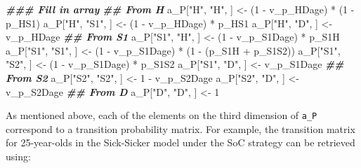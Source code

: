 \documentclass[
]{article}
\newenvironment{Shaded}{\begin{snugshade}}{\end{snugshade}}
\newcommand{\DecValTok}[1]{\textcolor[rgb]{0.00,0.00,0.81}{#1}}
\newcommand{\DocumentationTok}[1]{\textcolor[rgb]{0.56,0.35,0.01}{\textbf{\textit{#1}}}}
\newcommand{\NormalTok}[1]{#1}
\newcommand{\OtherTok}[1]{\textcolor[rgb]{0.56,0.35,0.01}{#1}}
\newcommand{\SpecialCharTok}[1]{\textcolor[rgb]{0.00,0.00,0.00}{#1}}
\newcommand{\StringTok}[1]{\textcolor[rgb]{0.31,0.60,0.02}{#1}}
\begin{document}
\begin{Shaded}
\begin{Highlighting}[]
\DocumentationTok{\#\#\# Fill in array}
\DocumentationTok{\#\# From H}
\NormalTok{a\_P[}\StringTok{"H"}\NormalTok{, }\StringTok{"H"}\NormalTok{, ]   }\OtherTok{\textless{}{-}}\NormalTok{ (}\DecValTok{1} \SpecialCharTok{{-}}\NormalTok{ v\_p\_HDage) }\SpecialCharTok{*}\NormalTok{ (}\DecValTok{1} \SpecialCharTok{{-}}\NormalTok{ p\_HS1)}
\NormalTok{a\_P[}\StringTok{"H"}\NormalTok{, }\StringTok{"S1"}\NormalTok{, ]  }\OtherTok{\textless{}{-}}\NormalTok{ (}\DecValTok{1} \SpecialCharTok{{-}}\NormalTok{ v\_p\_HDage) }\SpecialCharTok{*}\NormalTok{ p\_HS1}
\NormalTok{a\_P[}\StringTok{"H"}\NormalTok{, }\StringTok{"D"}\NormalTok{, ]   }\OtherTok{\textless{}{-}}\NormalTok{ v\_p\_HDage}
\DocumentationTok{\#\# From S1}
\NormalTok{a\_P[}\StringTok{"S1"}\NormalTok{, }\StringTok{"H"}\NormalTok{, ]  }\OtherTok{\textless{}{-}}\NormalTok{ (}\DecValTok{1} \SpecialCharTok{{-}}\NormalTok{ v\_p\_S1Dage) }\SpecialCharTok{*}\NormalTok{ p\_S1H}
\NormalTok{a\_P[}\StringTok{"S1"}\NormalTok{, }\StringTok{"S1"}\NormalTok{, ] }\OtherTok{\textless{}{-}}\NormalTok{ (}\DecValTok{1} \SpecialCharTok{{-}}\NormalTok{ v\_p\_S1Dage) }\SpecialCharTok{*}\NormalTok{ (}\DecValTok{1} \SpecialCharTok{{-}}\NormalTok{ (p\_S1H }\SpecialCharTok{+}\NormalTok{ p\_S1S2))}
\NormalTok{a\_P[}\StringTok{"S1"}\NormalTok{, }\StringTok{"S2"}\NormalTok{, ] }\OtherTok{\textless{}{-}}\NormalTok{ (}\DecValTok{1} \SpecialCharTok{{-}}\NormalTok{ v\_p\_S1Dage) }\SpecialCharTok{*}\NormalTok{ p\_S1S2}
\NormalTok{a\_P[}\StringTok{"S1"}\NormalTok{, }\StringTok{"D"}\NormalTok{, ]  }\OtherTok{\textless{}{-}}\NormalTok{ v\_p\_S1Dage}
\DocumentationTok{\#\# From S2}
\NormalTok{a\_P[}\StringTok{"S2"}\NormalTok{, }\StringTok{"S2"}\NormalTok{, ] }\OtherTok{\textless{}{-}} \DecValTok{1} \SpecialCharTok{{-}}\NormalTok{ v\_p\_S2Dage}
\NormalTok{a\_P[}\StringTok{"S2"}\NormalTok{, }\StringTok{"D"}\NormalTok{, ]  }\OtherTok{\textless{}{-}}\NormalTok{ v\_p\_S2Dage}
\DocumentationTok{\#\# From D}
\NormalTok{a\_P[}\StringTok{"D"}\NormalTok{, }\StringTok{"D"}\NormalTok{, ]   }\OtherTok{\textless{}{-}} \DecValTok{1}
\end{Highlighting}
\end{Shaded}

As mentioned above, each of the elements on the third dimension of \texttt{a\_P} correspond to a transition probability matrix. For example, the transition matrix for 25-year-olds in the Sick-Sicker model under the SoC strategy can be retrieved using:
\end{document}
